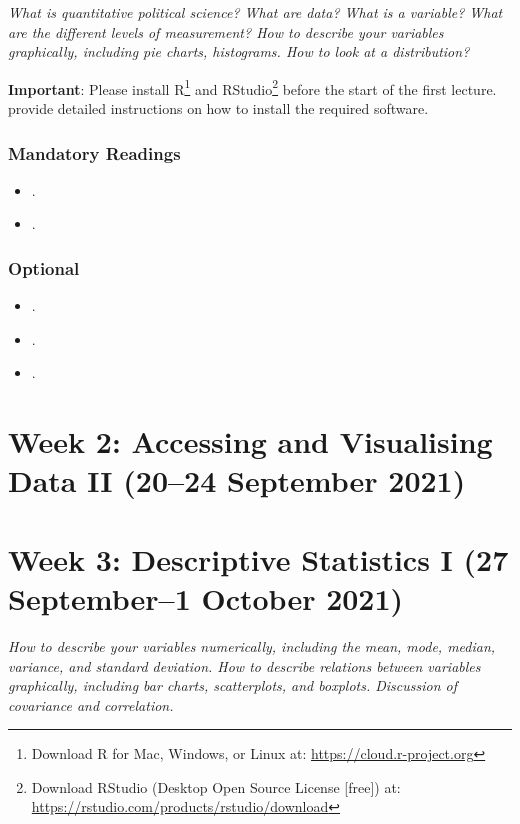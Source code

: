 \documentclass[abstract=on,parskip=full,headings=standardclasses,fontsize=11pt,paper=a4]{scrartcl}
\begin{document}
\textit{What is quantitative political science? What are data? What is a variable? What are the different levels of measurement? How to describe your variables graphically, including pie charts, histograms. How to look at a distribution?}

\textbf{Important}: Please install \textsf{R}\footnote{Download \textsf{R} for Mac, Windows, or Linux at: \url{https://cloud.r-project.org}} and \textsf{RStudio}\footnote{Download \textsf{RStudio} (Desktop Open Source License [free]) at: \url{https://rstudio.com/products/rstudio/download}} before the start of the first lecture.  \textcite[ch. 1]{ismay20} provide detailed instructions on how to install the required software.


\subsubsection*{Mandatory Readings}
\begin{itemize}
\item {}.
\item {}.
\end{itemize}

\subsubsection*{Optional}
\begin{itemize}
\item {}.
\item {}.
\item {}.
\end{itemize}

\section{Week 2: Accessing and Visualising Data II (20--24 September 2021)}



\section{Week 3: Descriptive Statistics I (27 September--1 October 2021)}

\textit{How to describe your variables numerically, including the mean, mode, median, variance, and standard deviation. How to describe relations between variables graphically, including bar charts, scatterplots, and boxplots. Discussion of covariance and correlation.}
\end{document}
